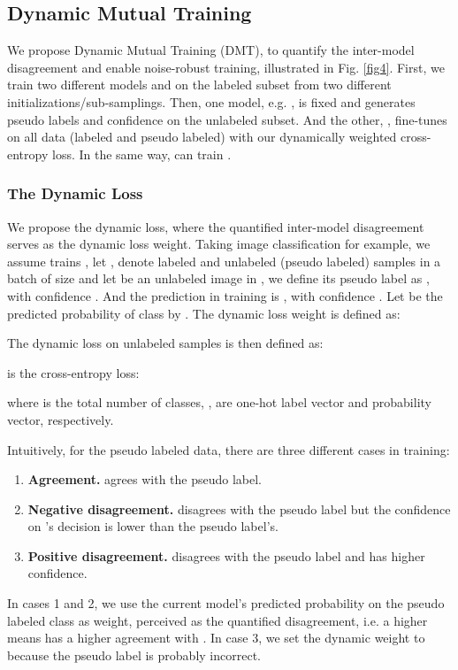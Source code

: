 \documentclass[preprint,review,10pt]{elsarticle}
\begin{document}
\subsection{Dynamic Mutual Training}
\label{sec:41}


We propose Dynamic Mutual Training (DMT), to quantify the inter-model disagreement and enable noise-robust training, illustrated in Fig. \ref{fig4}. First, we train two different models  and  on the labeled subset from two different initializations/sub-samplings. Then, one model, e.g. , is fixed and generates pseudo labels and confidence on the unlabeled subset. And the other, , fine-tunes on all data (labeled and pseudo labeled) with our dynamically weighted cross-entropy loss. In the same way,  can train .


\subsubsection{The Dynamic Loss}
\label{sec:411}
We propose the dynamic loss, where the quantified inter-model disagreement serves as the dynamic loss weight. Taking image classification for example, we assume  trains , let ,  denote labeled and unlabeled (pseudo labeled) samples in a batch of size  and let  be an unlabeled image in , we define its pseudo label as , with confidence . And the prediction in training is , with confidence . Let  be the predicted probability of class  by . The dynamic loss weight  is defined as:



The dynamic loss on unlabeled samples  is then defined as:

 is the cross-entropy loss:

where  is the total number of classes, ,  are one-hot label vector and probability vector, respectively.

Intuitively, for the pseudo labeled data, there are three different cases in training: 
\begin{enumerate}
    \item \textbf{Agreement.}  agrees with the pseudo label.
    \item \textbf{Negative disagreement.}  disagrees with the pseudo label but the confidence on 's decision is lower than the pseudo label's.
    \item \textbf{Positive disagreement.}  disagrees with the pseudo label and has higher confidence.
\end{enumerate}
In cases 1 and 2, we use the current model's predicted probability  on the pseudo labeled class as weight, perceived as the quantified disagreement, i.e. a higher  means  has a higher agreement with . In case 3, we set the dynamic weight to  because the pseudo label is probably incorrect.
\end{document}
